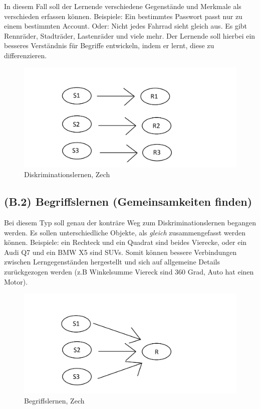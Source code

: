 In diesem Fall soll der Lernende verschiedene Gegenstände und Merkmale als verschieden erfassen können. Beispiele: Ein bestimmtes Passwort passt nur zu einem bestimmten Account. Oder: Nicht jedes Fahrrad sieht gleich aus. Es gibt Rennräder, Stadträder, Lastenräder und viele mehr. Der Lernende soll hierbei ein besseres Verständnis für Begriffe entwickeln, indem er lernt, diese zu differenzieren.

\begin{figure}[!ht]
\noindent\hspace{0.5mm}\includegraphics[width=12cm]{./Ressourcen/Begriffslernen.png}
\caption{Diskriminationslernen, Zech}
\end{figure}

\subsection[]{(B.2) Begriffslernen (Gemeinsamkeiten finden)}

Bei diesem Typ soll genau der konträre Weg zum Diskriminationslernen begangen werden. Es sollen unterschiedliche Objekte, als \textit{gleich} zusammengefasst werden können. 
Beispiele: ein Rechteck und ein Quadrat sind beides Vierecke, oder ein Audi Q7 und ein BMW X5 sind SUVs. Somit können bessere Verbindungen zwischen Lerngegenständen hergestellt und sich auf allgemeine Details zurückgezogen werden (z.B Winkelsumme Viereck sind 360 Grad, Auto hat einen Motor).


\begin{figure}[!ht]
\noindent\hspace{0.5mm}\includegraphics[width=12cm]{./Ressourcen/Diskrimination.png}
\caption{Begriffslernen, Zech}
\end{figure}

